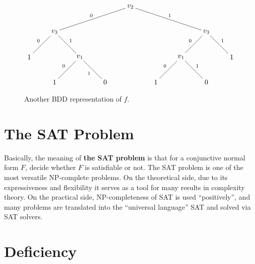 \documentclass[12pt]{book}
\begin{document}
\begin{examp}
\begin{figure}[h]
            \begin{displaymath}
                  \xygraph{
                 []{v_2} ( 
                 - [dlll]{v_3}_0 (
                 - [dl]{1}_0 (),
                 - [dr]{v_1}^1 (
                 - [dl]{1}_0 (),
                 - [dr]{0}_1 ()
                 )
                 ),
                 - [drrr]{v_3}^1 (
                 - [dl]{v_1}_0 (
                 - [dl]{1}_0 (),
                 - [dr]{0}^1 ()
                 ),
                 -[dr]{1}^1 ()
                 )
                 )
                 }
            \end{displaymath}
           \caption{Another BDD representation of $f$.}
           \label{fig:BooleanFunctionDTExampDT2}
      \end{figure}
\end{examp}
\section{The SAT Problem}
\label{sec:The SAT Problem}

\begin{defi}\label{def:sat} Basically, the meaning of \textbf{the SAT problem} is that for a conjunctive normal form $F$, decide whether $F$ is satisfiable or not.
      The SAT problem is one of the most versatile NP-complete problems. On the theoretical side, due to its expressiveness and flexibility it 
      serves as a tool for many results in complexity theory. On the practical side, NP-completeness of SAT is used “positively”, and many problems 
      are translated into  the “universal language” SAT and solved via SAT solvers. 
\end{defi}
\section{Deficiency}
\label{sec:Deficiency}
\end{document}
